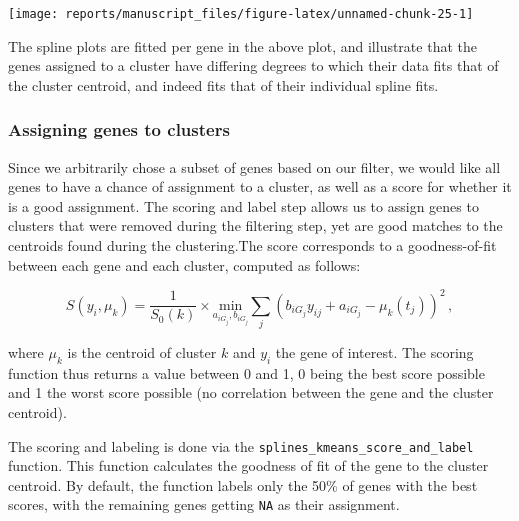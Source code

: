 \documentclass[9pt,a4paper,]{extarticle}
\newenvironment{Shaded}{\begin{snugshade}}{\end{snugshade}}
\newcommand{\CommentTok}[1]{\textcolor[rgb]{0.56,0.35,0.01}{\textit{#1}}}
\newcommand{\KeywordTok}[1]{\textcolor[rgb]{0.13,0.29,0.53}{\textbf{#1}}}
\newcommand{\NormalTok}[1]{#1}
\newcommand{\OperatorTok}[1]{\textcolor[rgb]{0.81,0.36,0.00}{\textbf{#1}}}
\newcommand{\StringTok}[1]{\textcolor[rgb]{0.31,0.60,0.02}{#1}}
\begin{document}
\begin{center}\texttt{[image: reports/manuscript\_files/figure-latex/unnamed-chunk-25-1]} \end{center}

The spline plots are fitted per gene in the above plot, and illustrate that
the genes assigned to a cluster have differing degrees to which their data
fits that of the cluster centroid, and indeed fits that of their individual
spline fits.

\hypertarget{assigning-genes-to-clusters}{%
\subsubsection{Assigning genes to clusters}\label{assigning-genes-to-clusters}}

Since we arbitrarily chose a subset of genes based on our filter, we would
like all genes to have a chance of assignment to a cluster, as well as a score
for whether it is a good assignment. The scoring and label step allows us to
assign genes to clusters that were removed during the filtering step, yet are
good matches to the centroids found during the clustering.The score
corresponds to a goodness-of-fit between each gene and each cluster, computed
as follows:

\[
S(y_i, \mu_k) =  \frac{1}{S_0(k)} \times \underset{a_{iG_j}, b_{iG_j}}{\text{min}}\sum_{j}
  {\left(b_{iG_j}y_{ij} + a_{iG_j}
   - \mu_k(t_j)\right)}^2 \,,
\]

where \(\mu_k\) is the centroid of cluster \(k\) and \(y_i\) the gene of interest.
The scoring function thus returns a value between 0 and 1, 0 being the best
score possible and 1 the worst score possible (no correlation between the gene
and the cluster centroid).

The scoring and labeling is done via the \texttt{splines\_kmeans\_score\_and\_label}
function. This function calculates the goodness of fit of the gene to the
cluster centroid. By default, the function labels only the 50\% of genes with
the best scores, with the remaining genes getting \texttt{NA} as their assignment.

\begin{Shaded}
\end{Shaded}
\end{document}
